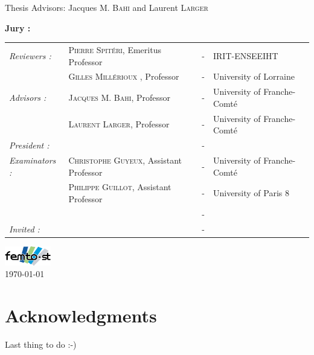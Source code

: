 \documentclass[french,book,nopubpage,nodocumentinfo]{upmethodology-document}
\makeatletter
\def\cleardoublepage{\clearpage\if@twoside \ifodd\c@page\else%
  \hbox{}%
  \thispagestyle{empty}%
  \newpage%
  \if@twocolumn\hbox{}\newpage\fi\fi\fi}
\makeatother
\begin{document}
\begin{titlepage}
\begin{center}
\noindent \Large Thesis Advisors:  Jacques \textsc{M. Bahi} and Laurent \textsc{Larger}\\
\vspace*{0.2cm}
\end{center}

\textbf{Jury :} \\
\begin{center}
\noindent \large 
\begin{tabular}{llcl}
      \textit{Reviewers :}	&   \textsc{Pierre Spit\'{e}ri}, Emeritus Professor		& - & IRIT-ENSEEIHT \\
				&   \textsc{Gilles Mill\'{e}rioux }, Professor		& - &  University of Lorraine\\
      \textit{Advisors :}	&  \textsc{Jacques M. Bahi}, Professor		& - & University of Franche-Comt\'{e} \\
&  \textsc{Laurent Larger}, Professor		& - & University of Franche-Comt\'{e} \\
      \textit{President :}	&  \textsc{}		& - & \\
      \textit{Examinators :}   &  \textsc{Christophe Guyeux}, Assistant Professor        & - &  University of Franche-Comt\'{e}\\
      				&  \textsc{Philippe Guillot}, Assistant Professor			& - & University of Paris 8\\
      				& \textsc{}		& - & \\
      \textit{Invited :}		&  \textsc{}		& - & 
\end{tabular}


{\includegraphics[width=0.15\textwidth]{tlloria}\\[1cm] 
\large \today}

\end{center}

\end{titlepage}
\sloppy
\titlepage



 \cleardoublepage

\section*{Acknowledgments}

Last thing to do :-)

\end{document}
